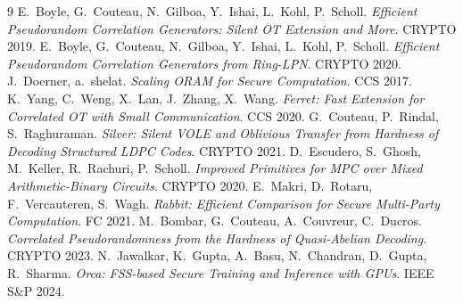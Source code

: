 \documentclass[11pt]{article}
\begin{document}
\begin{thebibliography}{9}
E.~Boyle, G.~Couteau, N.~Gilboa, Y.~Ishai, L.~Kohl, P.~Scholl.
\emph{Efficient Pseudorandom Correlation Generators: Silent OT Extension and
More}. CRYPTO 2019.
E.~Boyle, G.~Couteau, N.~Gilboa, Y.~Ishai, L.~Kohl, P.~Scholl.
\emph{Efficient Pseudorandom Correlation Generators from Ring-LPN}.
CRYPTO 2020.
J.~Doerner, a.~shelat. \emph{Scaling ORAM for Secure Computation}.
CCS 2017.
K.~Yang, C.~Weng, X.~Lan, J.~Zhang, X.~Wang.
\emph{Ferret: Fast Extension for Correlated OT with Small Communication}.
CCS 2020.
G.~Couteau, P.~Rindal, S.~Raghuraman.
\emph{Silver: Silent VOLE and Oblivious Transfer from Hardness of Decoding
Structured LDPC Codes}. CRYPTO 2021.
D.~Escudero, S.~Ghosh, M.~Keller, R.~Rachuri, P.~Scholl.
\emph{Improved Primitives for MPC over Mixed Arithmetic-Binary Circuits}.
CRYPTO 2020.
E.~Makri, D.~Rotaru, F.~Vercauteren, S.~Wagh.
\emph{Rabbit: Efficient Comparison for Secure Multi-Party Computation}.
FC 2021.
M.~Bombar, G.~Couteau, A.~Couvreur, C.~Ducros.
\emph{Correlated Pseudorandomness from the Hardness of Quasi-Abelian
Decoding}. CRYPTO 2023.
N.~Jawalkar, K.~Gupta, A.~Basu, N.~Chandran, D.~Gupta, R.~Sharma.
\emph{Orca: FSS-based Secure Training and Inference with GPUs}.
IEEE S\&P 2024.
\end{thebibliography}
\end{document}
